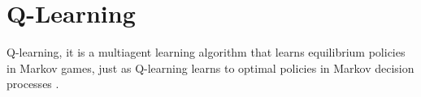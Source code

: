 \chapter{Q-Learning}

Q-learning, it is a multiagent learning algorithm that learns equilibrium policies in Markov games, just as Q-learning learns to optimal policies in Markov decision processes \cite{Greenwald2003}. 